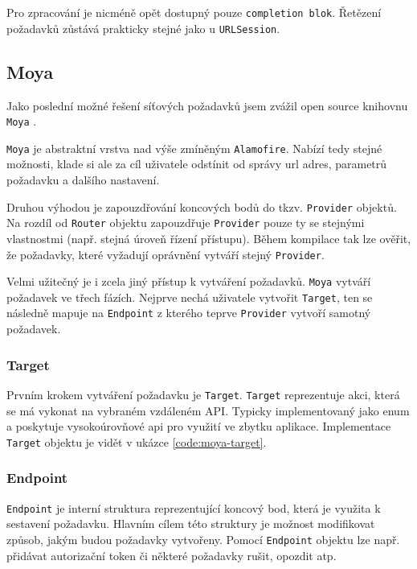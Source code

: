 Pro zpracování je nicméně opět dostupný pouze \texttt{completion blok}.
Řetězení požadavků zůstává prakticky stejné jako u \texttt{URLSession}.

\subsection{Moya}

Jako poslední možné řešení síťových požadavků jsem zvážil open source knihovnu \texttt{Moya} \cite{github-moya}.

\texttt{Moya} je abstraktní vrstva nad výše zmíněným \texttt{Alamofire}.
Nabízí tedy stejné možnosti, klade si ale za cíl uživatele odstínit od správy \acrshort{url} adres, parametrů požadavku a dalšího nastavení.

Druhou výhodou je zapouzdřování koncových bodů do tkzv. \texttt{Provider} objektů.
Na rozdíl od \texttt{Router} objektu zapouzdřuje \texttt{Provider} pouze ty se stejnými vlastnostmi (např. stejná úroveň řízení přístupu).
Během kompilace tak lze ověřit, že požadavky, které vyžadují oprávnění vytváří stejný \texttt{Provider}.

\medskip

Velmi užitečný je i zcela jiný přístup k vytváření požadavků.
\texttt{Moya} vytváří požadavek ve třech fázích.
Nejprve nechá uživatele vytvořit \texttt{Target}, ten se následně mapuje na \texttt{Endpoint} z kterého teprve \texttt{Provider} vytvoří samotný požadavek.

\subsubsection*{Target}

Prvním krokem vytváření požadavku je \texttt{Target}.
\texttt{Target} reprezentuje akci, která se má vykonat na vybraném vzdáleném API.
Typicky implementovaný jako enum a poskytuje vysokoúrovňové \acrshort{api} pro využití ve zbytku aplikace.
Implementace \texttt{Target} objektu je vidět v ukázce \ref{code:moya-target}.


\subsubsection*{Endpoint}

\texttt{Endpoint} je interní struktura reprezentující koncový bod, která je využita k sestavení požadavku.
Hlavním cílem této struktury je možnost modifikovat způsob, jakým budou požadavky vytvořeny.
Pomocí \texttt{Endpoint} objektu lze např. přidávat autorizační token či některé požadavky rušit, opozdit atp.

